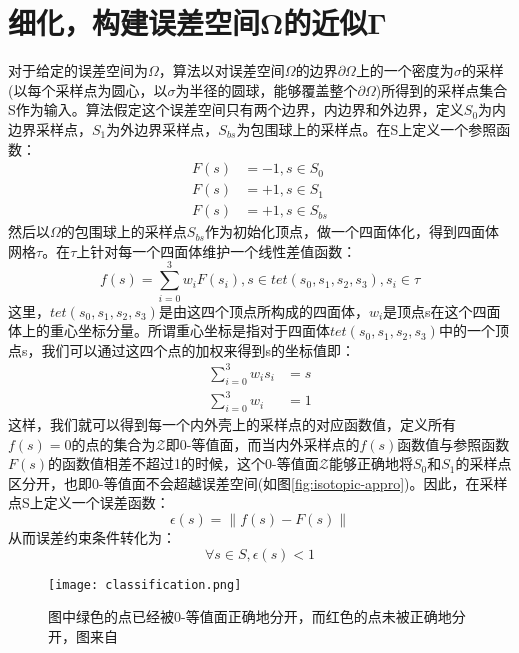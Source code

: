 \section{细化，构建误差空间Ω的近似Γ}
对于给定的误差空间为$\Omega$，算法以对误差空间$\Omega$的边界$\partial \Omega$上的一个密度为$\sigma$的采样(以每个采样点为圆心，以$\sigma$为半径的圆球，能够覆盖整个$\partial \Omega$)所得到的采样点集合S作为输入。算法假定这个误差空间只有两个边界，内边界和外边界，定义$S_0$为内边界采样点，$S_1$为外边界采样点，$S_{bs}$为包围球上的采样点。在S上定义一个参照函数：
\begin{equation}
  \begin{split}
    F(s) &= -1, s\in S_0\\
    F(s) &= +1, s\in S_1\\
    F(s) &= +1, s\in S_{bs}
  \end{split}
\end{equation}
然后以$\Omega$的包围球上的采样点$S_{bs}$作为初始化顶点，做一个四面体化，得到四面体网格$\tau$。在$\tau$上针对每一个四面体维护一个线性差值函数：
\begin{equation}
  f(s) = \sum_{i=0}^3 w_iF(s_i), s\in tet(s_0, s_1, s_2, s_3), s_i \in \tau
\end{equation}
这里，$tet(s_0, s_1, s_2, s_3)$是由这四个顶点所构成的四面体，$w_i$是顶点s在这个四面体上的重心坐标分量。所谓重心坐标是指对于四面体$tet(s_0, s_1, s_2, s_3)$中的一个顶点s，我们可以通过这四个点的加权来得到s的坐标值即：
\begin{equation}
  \begin{split}
  \sum_{i=0}^3 w_i s_i &= s\\
  \sum_{i=0}^3 w_i &= 1
  \end{split}
  \label{eq:err-constraint}
\end{equation}
这样，我们就可以得到每一个内外壳上的采样点的对应函数值，定义所有$f(s)=0$的点的集合为$\mathcal{Z}$即0-等值面，而当内外采样点的$f(s)$函数值与参照函数$F(s)$的函数值相差不超过1的时候，这个0-等值面$\mathcal{Z}$能够正确地将$S_0$和$S_1$的采样点区分开，也即0-等值面不会超越误差空间(如图\ref{fig:isotopic-appro})。因此，在采样点S上定义一个误差函数：
\begin{equation}
  \epsilon(s) = \lVert f(s)-F(s) \rVert
\end{equation}
从而误差约束条件转化为：
\begin{equation}
  \forall s \in S, \epsilon(s)<1
\end{equation}

\begin{figure}[htbp]
    \centering
    \texttt{[image: classification.png]}
    \caption{图中绿色的点已经被0-等值面正确地分开，而红色的点未被正确地分开，图来自\cite{isotopic-appro}}
    \label{fig:isotopic-classification}
\end{figure}

